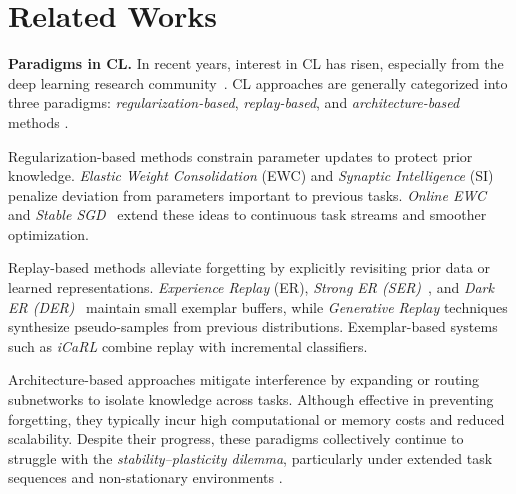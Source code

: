 \section{Related Works}\label{app:related_work}

\textbf{Paradigms in CL.}
In recent years, interest in CL has risen, especially from the deep learning research community~\cite{achille2018life, nguyen2017variational, schwarz2018progress, tasnim2024recast}. CL approaches are generally categorized into three paradigms: \emph{regularization-based}, \emph{replay-based}, and \emph{architecture-based} methods \cite{parisi2019continual,nguyen2019toward,schwarz2018progress}.

Regularization-based methods constrain parameter updates to protect prior knowledge. \emph{Elastic Weight Consolidation} (EWC) \cite{kirkpatrick2017overcoming} and \emph{Synaptic Intelligence} (SI) \cite{zenke2017continual} penalize deviation from parameters important to previous tasks. \emph{Online EWC} \cite{chaudhry2018efficient} and \emph{Stable SGD}~\cite{mirzadeh2020dropout} extend these ideas to continuous task streams and smoother optimization.

Replay-based methods alleviate forgetting by explicitly revisiting prior data or learned representations. \emph{Experience Replay} (ER), \emph{Strong ER (SER)}~\cite{zhuo2023continual}, and \emph{Dark ER (DER)}~\cite{buzzega2020dark} maintain small exemplar buffers, while \emph{Generative Replay} techniques \cite{shin2017continual,van2018generative} synthesize pseudo-samples from previous distributions. Exemplar-based systems such as \emph{iCaRL} \cite{rebuffi2017icarl} combine replay with incremental classifiers.

Architecture-based approaches \cite{fernando2017pathnet,masse2018alleviating,li2017learning} mitigate interference by expanding or routing subnetworks to isolate knowledge across tasks. Although effective in preventing forgetting, they typically incur high computational or memory costs and reduced scalability. Despite their progress, these paradigms collectively continue to struggle with the \emph{stability–plasticity dilemma}, particularly under extended task sequences and non-stationary environments \cite{chen2023stability,de2021continual}.

